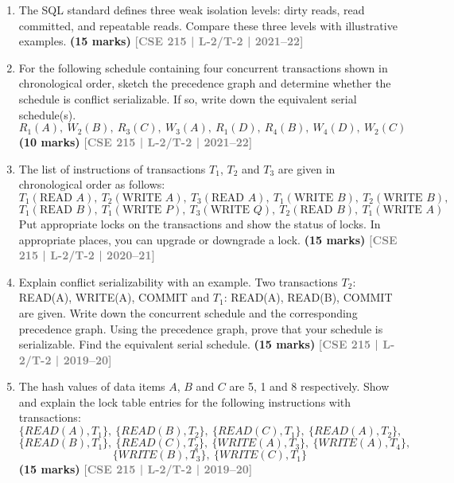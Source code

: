 \documentclass[12pt]{article}
\newcommand{\yr}[1]{\hfill\textcolor{gray}{\small\textbf{[#1]}}}
\newcommand{\mk}[1]{\textcolor{orange!70!black}{\small\textbf{(#1 marks)}}}
\begin{document}
\begin{enumerate}
\item The SQL standard defines three weak isolation levels: dirty reads, read committed, and repeatable reads. Compare these three levels with illustrative examples.
\mk{15} \yr{CSE 215 | L-2/T-2 | 2021--22}


\item For the following schedule containing four concurrent transactions shown in chronological order, sketch the precedence graph and determine whether the schedule is conflict serializable. If so, write down the equivalent serial schedule(s).
\[R_1(A),\ W_2(B),\ R_3(C),\ W_3(A),\ R_1(D),\ R_4(B),\ W_4(D),\ W_2(C)\]
\mk{10} \yr{CSE 215 | L-2/T-2 | 2021--22}


\item The list of instructions of transactions $T_1$, $T_2$ and $T_3$ are given in chronological order as follows:
\[T_1(\text{READ }A),\ T_2(\text{WRITE }A),\ T_3(\text{READ }A),\ T_1(\text{WRITE }B),\ T_2(\text{WRITE }B),\]
\[T_1(\text{READ }B),\ T_1(\text{WRITE }P),\ T_3(\text{WRITE }Q),\ T_2(\text{READ }B),\ T_1(\text{WRITE }A)\]
Put appropriate locks on the transactions and show the status of locks. In appropriate places, you can upgrade or downgrade a lock.
\mk{15} \yr{CSE 215 | L-2/T-2 | 2020--21}


\item Explain conflict serializability with an example. Two transactions $T_2$: READ(A), WRITE(A), COMMIT and $T_1$: READ(A), READ(B), COMMIT are given. Write down the concurrent schedule and the corresponding precedence graph. Using the precedence graph, prove that your schedule is serializable. Find the equivalent serial schedule.
\mk{15} \yr{CSE 215 | L-2/T-2 | 2019--20}


\item The hash values of data items $A$, $B$ and $C$ are 5, 1 and 8 respectively. Show and explain the lock table entries for the following instructions with transactions:
\[\{READ(A), T_1\},\ \{READ(B), T_2\},\ \{READ(C), T_1\},\ \{READ(A), T_2\},\]
\[\{READ(B), T_1\},\ \{READ(C), T_2\},\ \{WRITE(A), T_3\},\ \{WRITE(A), T_4\},\]
\[\{WRITE(B), T_3\},\ \{WRITE(C), T_1\}\]
\mk{15} \yr{CSE 215 | L-2/T-2 | 2019--20}



\end{enumerate}
\end{document}
